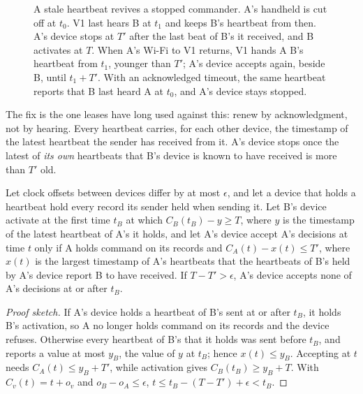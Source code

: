 \begin{figure}[t]
\centering

\caption{A stale heartbeat revives a stopped commander. A's handheld is cut off at $t_0$.
V1 last hears B at $t_1$ and keeps B's heartbeat from then. A's device stops at $T'$ after
the last beat of B's it received, and B activates at $T$. When A's Wi-Fi to V1 returns, V1
hands A B's heartbeat from $t_1$, younger than $T'$; A's device accepts again, beside B,
until $t_1 + T'$. With an acknowledged timeout, the same heartbeat reports that B last
heard A at $t_0$, and A's device stays stopped.}
\label{fig:relay}
\end{figure}

The fix is the one leases have long used against this: renew by acknowledgment, not by
hearing. Every heartbeat carries, for each other device, the timestamp of the latest
heartbeat the sender has received from it. A's device stops once the latest of \emph{its
own} heartbeats that B's device is known to have received is more than $T'$ old.

\begin{proposition}
\label{prop:single-acceptor}
Let clock offsets between devices differ by at most $\epsilon$, and let a device that
holds a heartbeat hold every record its sender held when sending it. Let B's device
activate at the first time $t_B$ at which $C_B(t_B) - y \geq T$, where $y$ is the timestamp
of the latest heartbeat of A's it holds, and let A's device accept A's decisions at time
$t$ only if A holds command on its records and $C_A(t) - x(t) \leq T'$, where $x(t)$ is the
largest timestamp of A's heartbeats that the heartbeats of B's held by A's device report B
to have received. If $T - T' > \epsilon$, A's device accepts none of A's decisions at or
after $t_B$.
\end{proposition}

\begin{proof}[Proof sketch]
If A's device holds a heartbeat of B's sent at or after $t_B$, it holds B's activation, so A
no longer holds command on its records and the device refuses. Otherwise every heartbeat
of B's that it holds was sent before $t_B$, and reports a value at most $y_B$, the value of
$y$ at $t_B$; hence $x(t) \leq y_B$. Accepting at $t$ needs $C_A(t) \leq y_B + T'$, while
activation gives $C_B(t_B) \geq y_B + T$. With $C_v(t) = t + o_v$ and
$o_B - o_A \leq \epsilon$, $t \leq t_B - (T - T') + \epsilon < t_B$.
\end{proof}

